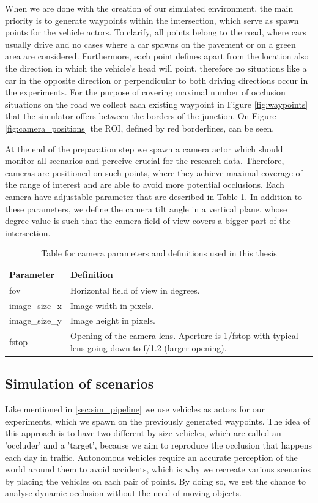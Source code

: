 When we are done with the creation of our simulated environment, the main priority is to generate waypoints within the intersection, which serve as spawn points for the vehicle actors. To clarify, all points belong to the road, where cars usually drive and no cases where a car spawns on the pavement or on a green area are considered. Furthermore, each point defines apart from the location also the direction in which the vehicle's head will point, therefore no situations like a car in the opposite direction or perpendicular to both driving directions occur in the experiments. For the purpose of covering maximal number of occlusion situations on the road we collect each existing waypoint in Figure \ref{fig:waypoints} that the simulator offers between the borders of the junction. On Figure \ref{fig:camera_positions} the ROI, defined by red borderlines, can be seen.

At the end of the preparation step we spawn a camera actor which should monitor all scenarios and perceive crucial for the research data. Therefore, cameras are positioned on such points, where they achieve maximal coverage of the range of interest and are able to avoid more potential occlusions. Each camera have adjustable parameter that are described in Table \ref{tab:camera_params}. In addition to these parameters, we define the camera tilt angle in a vertical plane, whose degree value is such that the camera field of view covers a bigger part of the intersection. 
\begin{table}[h]
\caption{Table for camera parameters and definitions used in this thesis\label{tab:camera_params}}
\centering
    \begin{tabular}{ | l | p{5cm} |}
    \hline
    Parameter & Definition  \\ \hline
    fov & Horizontal field of view in degrees. \\ \hline
    image\_size\_x & Image width in pixels. \\ \hline
    image\_size\_y & Image height in pixels. \\ \hline
    fstop & Opening of the camera lens. Aperture is 1/fstop with typical
    lens going down to f/1.2 (larger opening). \\ \hline
    \end{tabular}
\end{table}

\subsection{Simulation of scenarios}
Like mentioned in \ref{sec:sim_pipeline} we use vehicles as actors for our experiments, which we spawn on the previously generated waypoints. The idea of this approach is to have two different by size vehicles, which are called an 'occluder' and a 'target', because we aim to reproduce the occlusion that happens each day in traffic. Autonomous vehicles require an accurate perception of the world around them to avoid accidents, which is why we recreate various scenarios by placing the vehicles on each pair of points. By doing so, we get the chance to analyse dynamic occlusion without the need of moving objects.

